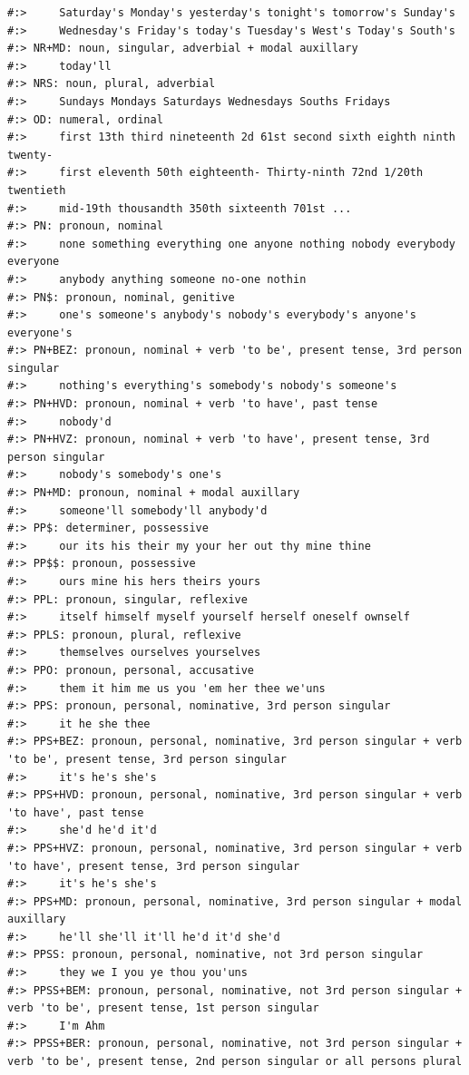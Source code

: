 \documentclass[
]{book}
\begin{document}
\begin{verbatim}
#:>     Saturday's Monday's yesterday's tonight's tomorrow's Sunday's
#:>     Wednesday's Friday's today's Tuesday's West's Today's South's
#:> NR+MD: noun, singular, adverbial + modal auxillary
#:>     today'll
#:> NRS: noun, plural, adverbial
#:>     Sundays Mondays Saturdays Wednesdays Souths Fridays
#:> OD: numeral, ordinal
#:>     first 13th third nineteenth 2d 61st second sixth eighth ninth twenty-
#:>     first eleventh 50th eighteenth- Thirty-ninth 72nd 1/20th twentieth
#:>     mid-19th thousandth 350th sixteenth 701st ...
#:> PN: pronoun, nominal
#:>     none something everything one anyone nothing nobody everybody everyone
#:>     anybody anything someone no-one nothin
#:> PN$: pronoun, nominal, genitive
#:>     one's someone's anybody's nobody's everybody's anyone's everyone's
#:> PN+BEZ: pronoun, nominal + verb 'to be', present tense, 3rd person singular
#:>     nothing's everything's somebody's nobody's someone's
#:> PN+HVD: pronoun, nominal + verb 'to have', past tense
#:>     nobody'd
#:> PN+HVZ: pronoun, nominal + verb 'to have', present tense, 3rd person singular
#:>     nobody's somebody's one's
#:> PN+MD: pronoun, nominal + modal auxillary
#:>     someone'll somebody'll anybody'd
#:> PP$: determiner, possessive
#:>     our its his their my your her out thy mine thine
#:> PP$$: pronoun, possessive
#:>     ours mine his hers theirs yours
#:> PPL: pronoun, singular, reflexive
#:>     itself himself myself yourself herself oneself ownself
#:> PPLS: pronoun, plural, reflexive
#:>     themselves ourselves yourselves
#:> PPO: pronoun, personal, accusative
#:>     them it him me us you 'em her thee we'uns
#:> PPS: pronoun, personal, nominative, 3rd person singular
#:>     it he she thee
#:> PPS+BEZ: pronoun, personal, nominative, 3rd person singular + verb 'to be', present tense, 3rd person singular
#:>     it's he's she's
#:> PPS+HVD: pronoun, personal, nominative, 3rd person singular + verb 'to have', past tense
#:>     she'd he'd it'd
#:> PPS+HVZ: pronoun, personal, nominative, 3rd person singular + verb 'to have', present tense, 3rd person singular
#:>     it's he's she's
#:> PPS+MD: pronoun, personal, nominative, 3rd person singular + modal auxillary
#:>     he'll she'll it'll he'd it'd she'd
#:> PPSS: pronoun, personal, nominative, not 3rd person singular
#:>     they we I you ye thou you'uns
#:> PPSS+BEM: pronoun, personal, nominative, not 3rd person singular + verb 'to be', present tense, 1st person singular
#:>     I'm Ahm
#:> PPSS+BER: pronoun, personal, nominative, not 3rd person singular + verb 'to be', present tense, 2nd person singular or all persons plural

\end{verbatim}
\end{document}
